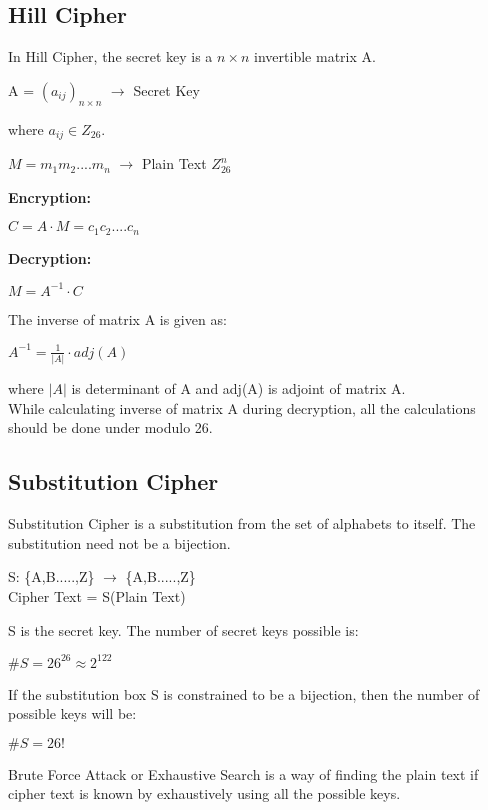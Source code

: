 \documentclass[11pt]{article}
\begin{document}
\subsection{Hill Cipher}
In Hill Cipher, the secret key is a $n \times n$ invertible matrix A.
\begin{center}
    A = $(a_{ij})_{n \times n}$ $\rightarrow$ Secret Key
\end{center}
where $a_{ij} \in Z_{26}$.
\begin{center}
    $M = m_1m_2....m_n$ $\rightarrow$ Plain Text \in$ Z_{26}^n$
\end{center}
\textbf{Encryption:}
\begin{center}
    $C = A \cdot M = c_1c_2....c_n$
\end{center}
\textbf{Decryption:}
\begin{center}
    $M = A^{-1} \cdot C$
\end{center}
The inverse of matrix A is given as:
\begin{center}
    $A^{-1} = \frac {1}{|A|} \cdot adj(A)$
\end{center}
where $|A|$ is determinant of A and adj(A) is adjoint of matrix A.\\
While calculating inverse of matrix A during decryption, all the calculations should be done under modulo 26.

\subsection{Substitution Cipher}
Substitution Cipher is a substitution from the set of alphabets to itself. The substitution need not be a bijection.
\begin{center}
    S: \{A,B.....,Z\} $\rightarrow$ \{A,B.....,Z\} \\
    Cipher Text = S(Plain Text)
\end{center}
S is the secret key. The number of secret keys possible is:
\begin{center}
    $\#S = 26^{26} \approx 2^{122}$
\end{center}
If the substitution box S is constrained to be a bijection, then the number of possible keys will be:
\begin{center}
    $\#S = 26!$
\end{center}
Brute Force Attack or Exhaustive Search is a way of finding the plain text if cipher text is known by exhaustively using all the possible keys.
\end{document}
